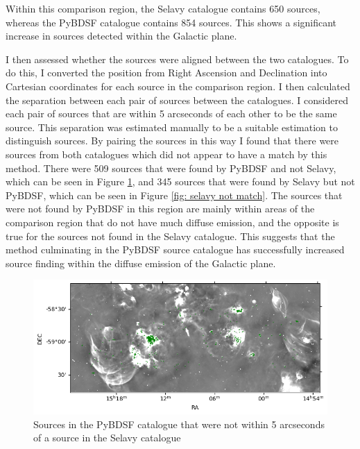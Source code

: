 Within this comparison region, the Selavy catalogue contains 650 sources, whereas the PyBDSF catalogue contains 854 sources. This shows a significant increase in sources detected within the Galactic plane.

I then assessed whether the sources were aligned between the two catalogues. To do this, I converted the position from Right Ascension and Declination into Cartesian coordinates for each source in the comparison region. I then calculated the separation between each pair of sources between the catalogues. I considered each pair of sources that are within 5 arcseconds of each other to be the same source. This separation was estimated manually to be a suitable estimation to distinguish sources. By pairing the sources in this way I found that there were sources from both catalogues which did not appear to have a match by this method. There were 509 sources that were found by PyBDSF and not Selavy, which can be seen in Figure \ref{fig: pybdsf not match}, and 345 sources that were found by Selavy but not PyBDSF, which can be seen in Figure \ref{fig: selavy not match}. The sources that were not found by PyBDSF in this region are mainly within areas of the comparison region that do not have much diffuse emission, and the opposite is true for the sources not found in the Selavy catalogue. This suggests that the method culminating in the PyBDSF source catalogue has successfully increased source finding within the diffuse emission of the Galactic plane.

\begin{figure}
    \centering
    \includegraphics[width=\linewidth]{Thesis_Template/Figures/Py match.png}
    \caption[PyBDSF only sources]{Sources in the PyBDSF catalogue that were not within 5 arcseconds of a source in the Selavy catalogue}
    \label{fig: pybdsf not match}
\end{figure}

